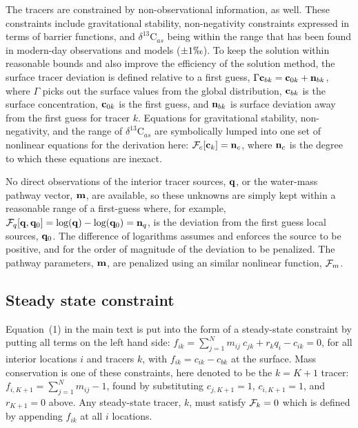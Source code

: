 \documentclass[agums]{aguplus}  %
\begin{document}
The tracers are constrained by non-observational information, as well.
These constraints include gravitational stability, non-negativity
constraints expressed in terms of barrier functions, and
$\delta^{13}$C$_{as}$ being within the range that has been found in
modern-day observations and models ($\pm 1\permil$).  To keep
the solution within reasonable bounds and also improve the efficiency
of the solution method, the surface tracer deviation is defined
relative to a first guess, $\Gamma {\bf c}_{bk} = {\bf c}_{0k} + {\bf
  n}_{bk}$, where $\Gamma$ picks out the surface values from the
global distribution, ${\bf c}_{bk}$ is the surface concentration,
${\bf c}_{0k}$ is the first guess, and ${\bf n}_{bk}$ is surface
deviation away from the first guess for tracer $k$. Equations for
gravitational stability, non-negativity, and the range of
$\delta^{13}$C$_{as}$ are symbolically lumped into one set of
nonlinear equations for the derivation here: ${\cal F}_c[{\bf c}_k] =
{\bf n}_c$, where ${\bf n}_c$ is the degree to which these equations
are inexact.

No direct observations of the interior tracer sources, ${\bf q}$, or
the water-mass pathway vector, ${\bf m}$, are available, so these
unknowns are simply kept within a reasonable range of a first-guess
where, for example, ${\cal F}_q[{\bf q},{\bf q}_0]=\mbox{log}({\bf q})
- \mbox{log}({\bf q}_0)={\bf n}_q$, is the deviation from the first
guess local sources, ${\bf q}_0$. The difference of logarithms assumes
and enforces the source to be positive, and for the order of magnitude
of the deviation to be penalized. The pathway parameters, ${\bf m}$,
are penalized using an similar nonlinear function, ${\cal F}_m$.

\subsection{Steady state constraint}

Equation~(1) in the main text is put into the form of a steady-state
constraint by putting all terms on the left hand side:
$f_{ik} = \sum^N_{j=1} m_{ij}~ c_{jk} + r_k q_i - c_{ik} = 0$, for all
interior locations $i$ and tracers $k$, with
$f_{ik} = c_{ik} - c_{bk}$ at the surface.  Mass conservation is one
of these constraints, here denoted to be the $k=K+1$ tracer:
$f_{i,K+1} = \sum^N_{j=1} m_{ij} - 1$, found by substituting
$c_{j,K+1}=1$, $c_{i,K+1}=1$, and $r_{K+1} = 0$ above.  Any
steady-state tracer, $k$, must satisfy ${\cal F}_k = 0$ which is
defined by appending $f_{ik}$ at all $i$ locations.
\end{document}
